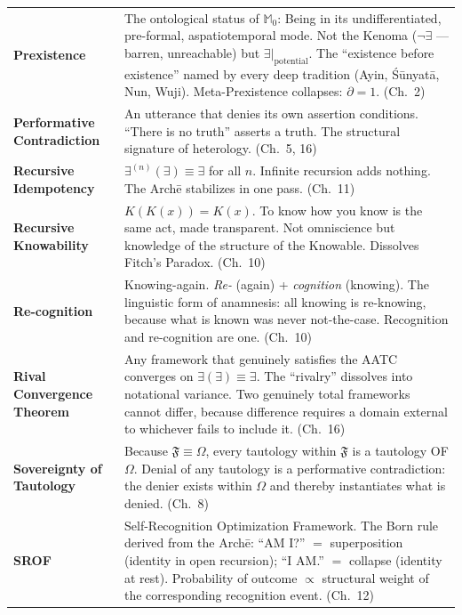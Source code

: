 \documentclass[10pt, openany, oneside]{book}
\renewcommand{\footnotesize}{\fontsize{8.5}{11}\selectfont}
\begin{document}
{\footnotesize
\noindent\begin{tabular}{@{} l @{\hspace{0.6em}} p{} @{}}
\textbf{Prexistence} & The ontological status of $\mathbb{M}_0$: Being in its undifferentiated, pre-formal, aspatiotemporal mode. Not the Kenoma ($\neg\exists$ --- barren, unreachable) but $\exists|_{\text{potential}}$. The ``existence before existence'' named by every deep tradition (Ayin, \'{S}\={u}nyat\={a}, Nun, Wuji). Meta-Prexistence collapses: $\partial = 1$. (Ch.\ 2) \\[0.3em]
\textbf{Performative Contradiction} & An utterance that denies its own assertion conditions. ``There is no truth'' asserts a truth. The structural signature of heterology. (Ch.\ 5, 16) \\[0.3em]
\textbf{Recursive Idempotency} & $\exists^{(n)}(\exists) \equiv \exists$ for all $n$. Infinite recursion adds nothing. The Arch\={e} stabilizes in one pass. (Ch.\ 11) \\[0.3em]
\textbf{Recursive Knowability} & $K(K(x)) = K(x)$. To know how you know is the same act, made transparent. Not omniscience but knowledge of the structure of the Knowable. Dissolves Fitch's Paradox. (Ch.\ 10) \\[0.3em]
\textbf{Re-cognition} & Knowing-again. \textit{Re-} (again) + \textit{cognition} (knowing). The linguistic form of anamnesis: all knowing is re-knowing, because what is known was never not-the-case. Recognition and re-cognition are one. (Ch.\ 10) \\[0.3em]
\textbf{Rival Convergence Theorem} & Any framework that genuinely satisfies the AATC converges on $\exists(\exists) \equiv \exists$. The ``rivalry'' dissolves into notational variance. Two genuinely total frameworks cannot differ, because difference requires a domain external to whichever fails to include it. (Ch.\ 16) \\[0.3em]
\textbf{Sovereignty of Tautology} & Because $\mathfrak{F} \equiv \Omega$, every tautology within $\mathfrak{F}$ is a tautology OF $\Omega$. Denial of any tautology is a performative contradiction: the denier exists within $\Omega$ and thereby instantiates what is denied. (Ch.\ 8) \\[0.3em]
\textbf{SROF} & Self-Recognition Optimization Framework. The Born rule derived from the Arch\={e}: ``AM I?'' $=$ superposition (identity in open recursion); ``I AM.'' $=$ collapse (identity at rest). Probability of outcome $\propto$ structural weight of the corresponding recognition event. (Ch.\ 12) \\[0.3em]

\end{tabular}}
\end{document}

